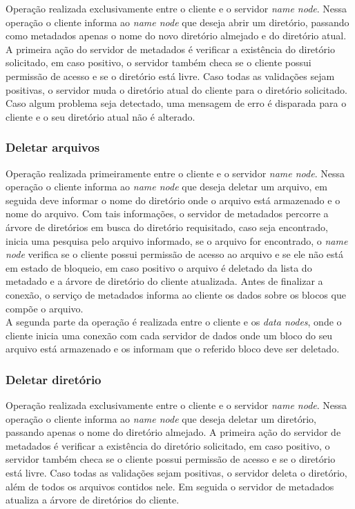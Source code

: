 Operação realizada exclusivamente entre o cliente e o servidor \textit{name node}. Nessa operação o cliente informa ao \textit{name node} que deseja abrir um diretório, passando como metadados apenas o nome do novo diretório almejado e do diretório atual. A primeira ação do servidor de metadados é verificar a existência do diretório solicitado, em caso positivo, o servidor também checa se o cliente possui permissão de acesso e se o diretório está livre. Caso todas as validações sejam positivas, o servidor muda o diretório atual do cliente para o diretório solicitado. Caso algum problema seja detectado, uma mensagem de erro é disparada para o cliente e o seu diretório atual não é alterado.
\\


\subsubsection{Deletar arquivos}

Operação realizada primeiramente entre o cliente e o servidor \textit{name node}. Nessa operação o cliente informa ao \textit{name node} que deseja deletar um arquivo, em seguida deve informar o nome do diretório onde o arquivo está armazenado e o nome do arquivo. Com tais informações, o servidor de metadados percorre a árvore de diretórios em busca do diretório requisitado, caso seja encontrado, inicia uma pesquisa pelo arquivo informado, se o arquivo for encontrado, o \textit{name node} verifica se o cliente possui permissão de acesso ao arquivo e se ele não está em estado de bloqueio, em caso positivo o arquivo é deletado da lista do metadado e a árvore de diretório do cliente atualizada. Antes de finalizar a conexão, o serviço de metadados informa ao cliente os dados sobre os blocos que compõe o arquivo.
\\

A segunda parte da operação é realizada entre o cliente e os \textit{data nodes}, onde o cliente inicia uma conexão com cada servidor de dados onde um bloco do seu arquivo está armazenado e os informam que o referido bloco deve ser deletado.
\\

\subsubsection{Deletar diretório}

Operação realizada exclusivamente entre o cliente e o servidor \textit{name node}. Nessa operação o cliente informa ao \textit{name node} que deseja deletar um diretório, passando apenas o nome do diretório almejado. A primeira ação do servidor de metadados é verificar a existência do diretório solicitado, em caso positivo, o servidor também checa se o cliente possui permissão de acesso e se o diretório está livre. Caso todas as validações sejam positivas, o servidor deleta o diretório, além de todos os arquivos contidos nele. Em seguida o servidor de metadados atualiza a árvore de diretórios do cliente.
\\

